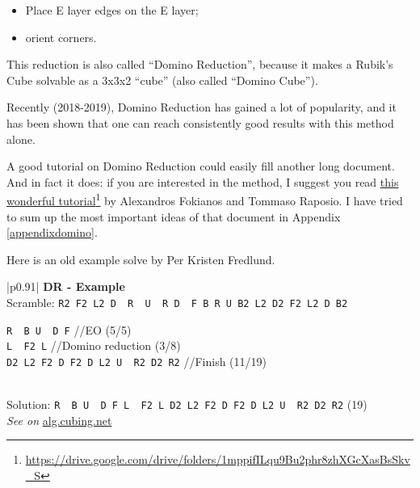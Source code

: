 \documentclass[11pt,a4paper]{book}
\newcommand{\p}{\textquotesingle}
\newcommand{\m}{\texttt}
\newcommand{\ps}{\p\,\,}
\newcommand{\comment}[1]{{\color{gray}\quad//#1}}
\begin{document}
\begin{itemize}
\item Place E layer edges on the E layer;
\item orient corners.
\end{itemize}

This reduction is also called ``Domino Reduction'', because it makes a Rubik's Cube solvable as a 3x3x2 ``cube'' (also called ``Domino Cube'').

Recently (2018-2019), Domino Reduction has gained a lot of popularity, and it has been shown that one can reach consistently good results with this method alone.

A good tutorial on Domino Reduction could easily fill another long document. And in fact it does: if you are interested in the method, I suggest you read \href{https://drive.google.com/drive/folders/1mppifILqu9Bu2phr8zhXGcXasBsSkv_S}{this wonderful tutorial}\footnote{\url{https://drive.google.com/drive/folders/1mppifILqu9Bu2phr8zhXGcXasBsSkv_S}} by Alexandros Fokianos and Tommaso Raposio. I have tried to sum up the most important ideas of that document in Appendix \ref{appendixdomino}.

Here is an old example solve by Per Kristen Fredlund.

\bigskip
\begin{tabular}{|p{}|}
\hline
\textbf{DR - Example}\\
\hline
Scramble: \m{R2 F2 L2 D\ps R\ps U\ps R D\ps F B R U B2 L2 D2 F2 L2 D B2}\\
\hline
\begin{minipage}[l]{0.650\textwidth}
\m{R\ps B U\ps D F} \comment{EO (5/5)}\\
\m{L\ps F2 L} \comment{Domino reduction (3/8)}\\
\m{D2 L2 F2 D F2 D L2 U\ps R2 D2 R2} \comment{Finish (11/19)}
\end{minipage}
\begin{minipage}[c]{0.25\textwidth}

\end{minipage}\\
\hline
Solution: \m{R\ps B U\ps D F L\ps F2 L D2 L2 F2 D F2 D L2 U\ps R2 D2 R2} (19)\\
\hline
\emph{See on }\href{https://alg.cubing.net/?setup=R2_F2_L2_D-_R-_U-_R_D-_F_B_R_U_B2_L2_D2_F2_L2_D_B2&alg=R-_B_U-_D_F_\%2F\%2FEO_(5\%2F5)\%0AL-_F2_L_\%2F\%2FDomino_Reduction(3\%2F8)\%0AD2_L2_F2_D_F2_D_L2_U-_R2_D2_R2_\%2F\%2FFinish_(11\%2F19)}{alg.cubing.net}\\
\hline
\end{tabular}
\bigskip
\end{document}
